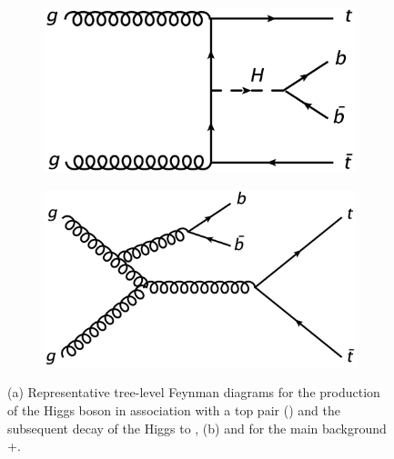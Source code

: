 \begin{figure}[tb!]
\begin{center}
  \begin{subfigure}{0.49\textwidth}
\includegraphics[width=\textwidth]{Analysis/Figures_ttH/ttHbb_fusion.png}
\caption{}\label{fig:feyn_ttH_1} \end{subfigure}
\begin{subfigure}{0.49\textwidth}
\includegraphics[width=\textwidth]{Analysis/Figures_ttH/ttbb.png}
\caption{}\label{fig:feyn_ttbb} \end{subfigure}
\caption{(a) Representative tree-level Feynman diagrams for the production of the Higgs boson in association with a top pair (\tth) and the subsequent decay of the Higgs to \bbbar, (b) and for the main background \ttbar+\bbbar. 
}
\label{fig:feynman}
\end{center}
\end{figure}

